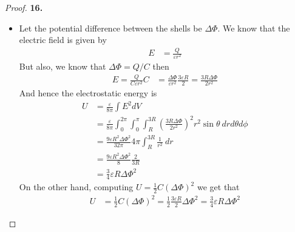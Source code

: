 \documentclass[11pt]{article}
\theoremstyle{definition}
\begin{document}
\begin{proof}{\textbf{16.}}
\begin{itemize}
\cleardoublepage
\item [(b)] Let the potential difference between the shells be $\Delta\Phi$.
We know that the electric field is given by
\begin{align*}
    E &= \frac{Q}{\varepsilon r^2}
\end{align*}
But also, we know that $\Delta \Phi = Q/C$ then
\begin{align*}
    E = \frac{Q}{C\varepsilon r^2}C
    &= \frac{\Delta\Phi}{\varepsilon r^2}\frac{3\varepsilon R}{2}
    = \frac{3 R \Delta\Phi}{2r^2}
\end{align*}
And hence the electrostatic energy is
\begin{align*}
    U &= \frac{\varepsilon}{8\pi} \int E^2 dV\\
    &= \frac{\varepsilon}{8\pi}\int_{0}^{2\pi}\int_0^\pi\int_R^{3R}
    \left(\frac{3 R \Delta\Phi}{2r^2}\right)^2 r^2\sin\theta ~drd\theta d\phi\\
    &= \frac{9\varepsilon R^2 \Delta\Phi^2}{32\pi}
    4\pi\int_R^{3R} \frac{1}{r^2} ~dr\\
    &= \frac{9\varepsilon R^2 \Delta\Phi^2}{8}
    \frac{2}{3R}\\
    &= \frac{3}{4}\varepsilon R\Delta\Phi^2
\end{align*}
On the other hand, computing $U = \frac{1}{2}C(\Delta \Phi)^2$ we get that
\begin{align*}
    U &= \frac{1}{2}C(\Delta \Phi)^2
    = \frac{1}{2} \frac{3\varepsilon R}{2}\Delta \Phi^2
    = \frac{3}{4} \varepsilon R \Delta \Phi^2
\end{align*}
\end{itemize}
\end{proof}
\end{document}
